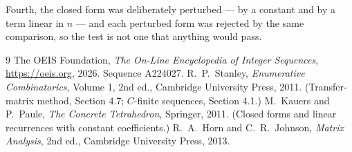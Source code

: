 \documentclass[11pt,a4paper]{article}
\theoremstyle{plain}
\theoremstyle{definition}
\begin{document}
Fourth, the closed form was deliberately perturbed --- by a constant and by a term linear in
$n$ --- and each perturbed form was rejected by the same comparison, so the test is not one
that anything would pass.

\begin{thebibliography}{9}
 The OEIS Foundation, \emph{The On-Line Encyclopedia of Integer
Sequences}, \url{https://oeis.org}, 2026. Sequence A224027.
 R.~P.~Stanley, \emph{Enumerative Combinatorics}, Volume 1, 2nd ed.,
Cambridge University Press, 2011. (Transfer-matrix method, Section 4.7; $C$-finite sequences,
Section 4.1.)
 M.~Kauers and P.~Paule, \emph{The Concrete Tetrahedron}, Springer, 2011.
(Closed forms and linear recurrences with constant coefficients.)
 R.~A.~Horn and C.~R.~Johnson, \emph{Matrix Analysis}, 2nd ed., Cambridge
University Press, 2013.
\end{thebibliography}
\end{document}
